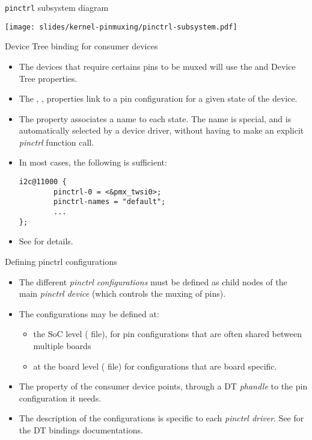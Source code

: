 \begin{frame}{{\tt pinctrl} subsystem diagram}
  \begin{center}
    \texttt{[image: slides/kernel-pinmuxing/pinctrl-subsystem.pdf]}
  \end{center}
\end{frame}

\begin{frame}[fragile]{Device Tree binding for consumer devices}
  \begin{itemize}
  \item The devices that require certains pins to be muxed will use
    the  and  Device Tree
    properties.
  \item The , , 
    properties link to a pin configuration for a given state of the
    device.
  \item The  property associates a name to each
    state. The name  is special, and is automatically
    selected by a device driver, without having to make an explicit
    {\em pinctrl} function call.
  \item In most cases, the following is sufficient:
    \begin{verbatim}
i2c@11000 {
        pinctrl-0 = <&pmx_twsi0>;
        pinctrl-names = "default";
        ...
};
\end{verbatim}
\item See
  for details.
\end{itemize}
\end{frame}

\begin{frame}{Defining pinctrl configurations}
  \begin{itemize}
  \item The different {\em pinctrl configurations} must be defined as
    child nodes of the main {\em pinctrl device} (which controls the
    muxing of pins).
  \item The configurations may be defined at:
    \begin{itemize}
    \item the SoC level ( file), for pin configurations
      that are often shared between multiple boards
    \item at the board level ( file) for configurations
      that are board specific.
    \end{itemize}
  \item The  property of the consumer device points,
    through a DT {\em phandle} to the pin configuration it needs.
  \item The description of the configurations is specific to each {\em
      pinctrl driver}. See
     for the DT
    bindings documentations.
  \end{itemize}
\end{frame}

